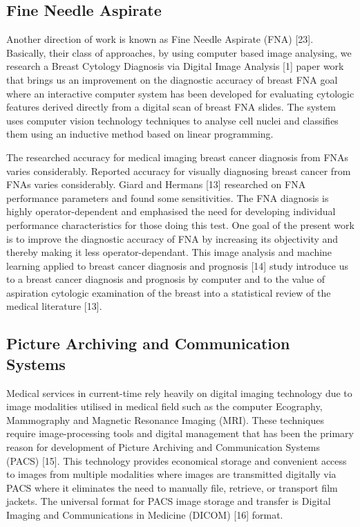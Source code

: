\subsection{Fine Needle Aspirate}

Another direction of work is known as Fine Needle Aspirate (FNA) [23]. Basically, their class of approaches, by using computer based image analysing, we research a Breast Cytology Diagnosis via Digital Image Analysis [1] paper work that brings us an improvement on the diagnostic accuracy of breast FNA goal where an interactive computer system has been developed for evaluating cytologic features derived directly from a digital scan of breast FNA slides. The system uses computer vision technology techniques to analyse cell nuclei and classifies them using an inductive method based on linear programming.

\clearpage

The researched accuracy for medical imaging breast cancer diagnosis from FNAs varies considerably. Reported accuracy for visually diagnosing breast cancer from FNAs varies considerably. Giard and Hermans [13] researched on FNA performance parameters and found some sensitivities. The FNA diagnosis is highly operator-dependent and emphasised the need for developing individual performance characteristics for those doing this test. One goal of the present work is to improve the diagnostic accuracy of FNA by increasing its objectivity and thereby making it less operator-dependant. This image analysis and machine learning applied to breast cancer diagnosis and prognosis [14] study introduce us to a breast cancer diagnosis and prognosis by computer and to the value of aspiration cytologic examination of the breast into a statistical review of the medical literature [13].

\subsection{Picture Archiving and Communication Systems}

Medical services in current-time rely heavily on digital imaging technology due to image modalities utilised in medical field such as the computer Ecography, Mammography and Magnetic Resonance Imaging (MRI). These techniques require image-processing tools and digital management that has been the primary reason for development of Picture Archiving and Communication Systems (PACS) [15]. This technology provides economical storage and convenient access to images from multiple modalities where images are transmitted digitally via PACS where it eliminates the need to manually file, retrieve, or transport film jackets. The universal format for PACS image storage and transfer is Digital Imaging and Communications in Medicine (DICOM) [16] format.

